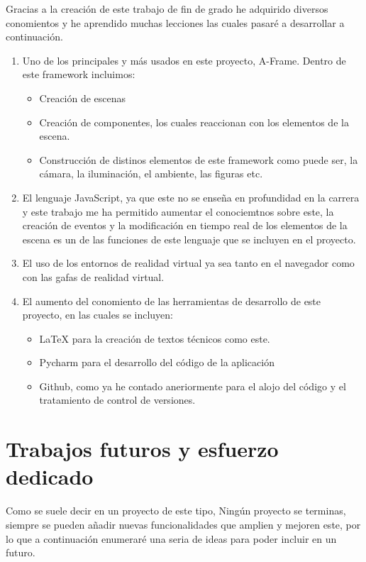 \documentclass[a4paper, 12pt]{book}
\begin{document}
Gracias a la creación de este trabajo de fin de grado he adquirido diversos conomientos y he aprendido muchas lecciones las cuales pasaré a desarrollar a continuación.
\begin{enumerate}
  \item Uno de los principales y más usados en este proyecto, A-Frame. Dentro de este framework incluimos:
  \begin{itemize}
      \item Creación de escenas
      \item Creación de componentes, los cuales reaccionan con los elementos de la escena.
      \item Construcción de distinos elementos de este framework como puede ser, la cámara, la iluminación, el ambiente, las figuras etc.
  \end{itemize}
  \item El lenguaje JavaScript, ya que este no se enseña en profundidad en la carrera y este trabajo me ha permitido aumentar el conociemtnos sobre este, la creación de eventos y la modificación en tiempo real de los elementos de la escena es un de las funciones de este lenguaje que se incluyen en el proyecto.
  \item El uso de los entornos de realidad virtual ya sea tanto en el navegador como con las gafas de realidad virtual.
  \item El aumento del conomiento de las herramientas de desarrollo de este proyecto, en las cuales se incluyen:
  \begin{itemize}
      \item LaTeX para la creación de textos técnicos como este.
      \item Pycharm para el desarrollo del código de la aplicación
      \item Github, como ya he contado aneriormente para el alojo del código y el tratamiento de control de versiones.
  \end{itemize}
\end{enumerate}


\section{Trabajos futuros y esfuerzo dedicado}
\label{sec:trabajos_futuros}

Como se suele decir en un proyecto de este tipo, Ningún proyecto se terminas, siempre se pueden añadir nuevas funcionalidades que amplien y mejoren este, por lo que a continuación enumeraré una seria de ideas para poder incluir en un futuro.
\end{document}
